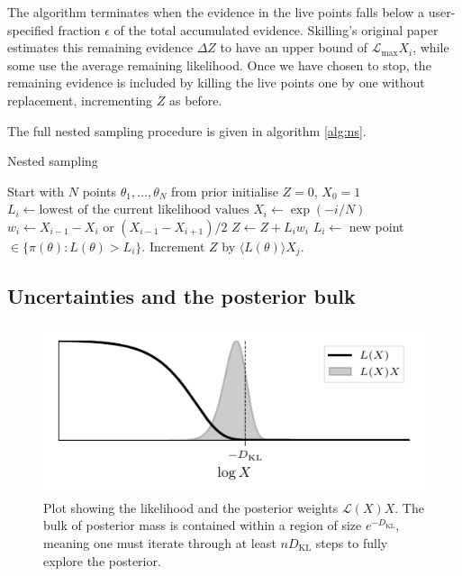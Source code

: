 \documentclass[usenatbib]{mnras}
\newcommand{\Like}{\mathcal{L}}
\newcommand{\DKL}{D_\mathrm{KL}}
\begin{document}
The algorithm terminates when the evidence in the live points falls below a user-specified fraction $\epsilon$ of the total accumulated evidence. Skilling's original paper estimates this remaining evidence $\Delta Z$ to have an upper bound of $ \Like_\mathrm{max} X_i$, while some use the average remaining likelihood. Once we have chosen to stop, the remaining evidence is included by killing the live points one by one without replacement, incrementing $Z$ as before. 
\par
The full nested sampling procedure is given in algorithm \ref{alg:ns}. 
\begin{algorithm}
\caption{Nested sampling}\label{alg:ns}
\begin{algorithmic}
\State Start with $N$ points $\theta_1, \ldots, \theta_N$ from prior
\State \hspace{\algorithmicindent} initialise $Z = 0$, $X_0 = 1$
\State $L_i \gets \text{lowest of the current likelihood values}$
\State $X_i \gets \exp(-i/N)$
\State $w_i \gets X_{i-1} - X_i$ or $(X_{i-1} - X_{i+1})/2$
\State $Z \gets Z + L_i w_i$
\State $L_i \gets $ new point $\in \{\pi(\theta): L(\theta) > L_i\}$.
\EndFor
\State Increment $Z$ by $\langle L(\theta) \rangle X_j$.
\end{algorithmic}
\end{algorithm}

\subsection{Uncertainties and the posterior bulk}\label{subsec:Uncertainties and the posterior bulk}
\begin{figure}
\begin{center}
	\includegraphics{Figures/LX.pdf}
\end{center}
\caption{Plot showing the likelihood and the posterior weights $\Like(X)X$. The bulk of posterior mass is contained within a region of size $e^{-\DKL}$, meaning one must iterate through at least $n\DKL$ steps to fully explore the posterior.}
\label{fig:LX}
\end{figure}
\end{document}
